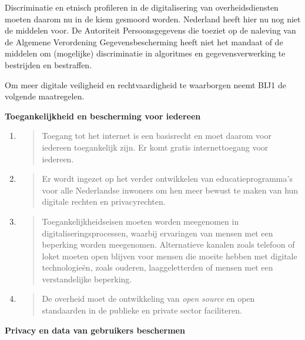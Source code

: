 Discriminatie en etnisch profileren in de digitalisering van
overheidsdiensten moeten daarom nu in de kiem gesmoord worden. Nederland
heeft hier nu nog niet de middelen voor. De Autoriteit Persoonsgegevens
die toeziet op de naleving van de Algemene Verordening
Gegevensbescherming heeft niet het mandaat of de middelen om (mogelijke)
discriminatie in algoritmes en gegevensverwerking te bestrijden en
bestraffen.

Om meer digitale veiligheid en rechtvaardigheid te waarborgen neemt BIJ1
de volgende maatregelen.

\textbf{Toegankelijkheid en bescherming voor iedereen}

\begin{enumerate}
\def\labelenumi{\arabic{enumi}.}
\item
  \begin{quote}
  Toegang tot het internet is een basisrecht en moet daarom voor
  iedereen toegankelijk zijn. Er komt gratis internettoegang voor
  iedereen.
  \end{quote}
\item
  \begin{quote}
  Er wordt ingezet op het verder ontwikkelen van educatieprogramma's
  voor alle Nederlandse inwoners om hen meer bewust te maken van hun
  digitale rechten en privacyrechten.
  \end{quote}
\item
  \begin{quote}
  Toegankelijkheidseisen moeten worden meegenomen in
  digitaliseringsprocessen, waarbij ervaringen van mensen met een
  beperking worden meegenomen. Alternatieve kanalen zoals telefoon of
  loket moeten open blijven voor mensen die moeite hebben met digitale
  technologieën, zoals ouderen, laaggeletterden of mensen met een
  verstandelijke beperking.
  \end{quote}
\item
  \begin{quote}
  De overheid moet de ontwikkeling van \emph{open source} en open
  standaarden in de publieke en private sector faciliteren.
  \end{quote}
\end{enumerate}

\textbf{Privacy en data van gebruikers beschermen}

